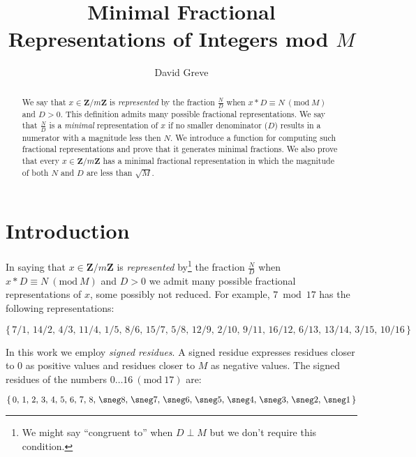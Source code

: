 \documentclass[submission,copyright,creativecommons]{eptcs}
\title{Minimal Fractional Representations of Integers mod $M$ }
\author{David Greve
\email{david@thegreves.com}
}
\newcommand{\Mod}[1]{\ (\mathrm{mod}\ #1)}
\begin{document}
\maketitle

\begin{abstract}

We say that $x \in \mathbf{Z}/m\mathbf{Z}$ is \emph{represented} by
the fraction $\frac{N}{D}$ when $x*D \equiv N \Mod{M}$ and $D > 0$.
This definition admits many possible fractional representations.  We
say that $\frac{N}{D}$ is a \emph{minimal} representation of $x$ if no
smaller denominator ($D$) results in a numerator with a magnitude less
then $N$.  We introduce a function for computing such fractional
representations and prove that it generates minimal fractions.  We
also prove that every $x \in \mathbf{Z}/m\mathbf{Z}$ has a minimal
fractional representation in which the magnitude of both $N$ and $D$
are less than $\sqrt{M}$.

\end{abstract}

\section{Introduction}

In saying that $x \in \mathbf{Z}/m\mathbf{Z}$ is \emph{represented}
by\footnote{ We might say ``congruent to'' when $D \perp M$ but we don't
require this condition.  }  the fraction $\frac{N}{D}$ when $x*D \equiv N
\Mod{M}$ and $D > 0$ we admit many possible fractional representations
of $x$, some possibly not reduced.  For example, $7 \bmod 17$ has the
following representations:

\[
\{
\,7/1,\, 14/2,\, 4/3,\, 11/4,\, 1/5,\, 8/6,\, 15/7,\, 5/8,\, 12/9 ,\, 2/10,\, 9/11,\, 16/12 ,\,6/13,\, 13/14,\, 3/15,\, 10/16 \,
\}
\]

In this work we employ \emph{signed residues}.  A signed
residue expresses residues closer to 0 as positive values and
residues closer to $M$ as negative values.  
The signed residues of the numbers $0\dots16 \Mod{17}$ are:

\[
\{
\,0,\,1,\,2,\,3,\,4,\,5,\,6,\,7,\,8,\,\sneg8,\,\sneg7,\,\sneg6,\,\sneg5,\,\sneg4,\,\sneg3,\,\sneg2,\,\sneg1\,
\}
\]
\end{document}
